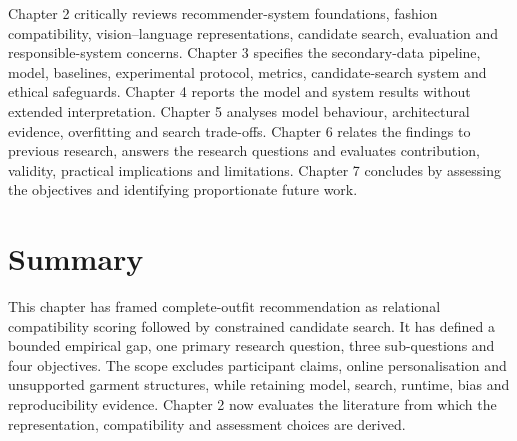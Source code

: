 Chapter 2 critically reviews recommender-system foundations, fashion
compatibility, vision--language representations, candidate search, evaluation
and responsible-system concerns. Chapter 3 specifies the secondary-data
pipeline, model, baselines, experimental protocol, metrics, candidate-search system
and ethical safeguards. Chapter 4 reports the model and system results without
extended interpretation. Chapter 5 analyses model behaviour, architectural
evidence, overfitting and search trade-offs. Chapter 6 relates the findings to
previous research, answers the research questions and evaluates contribution,
validity, practical implications and limitations. Chapter 7 concludes by
assessing the objectives and identifying proportionate future work.

\section{Summary}

This chapter has framed complete-outfit recommendation as relational
compatibility scoring followed by constrained candidate search. It has defined
a bounded empirical gap, one primary research question, three sub-questions
and four objectives. The scope excludes participant claims, online
personalisation and unsupported garment structures, while retaining model,
search, runtime, bias and reproducibility evidence. Chapter 2 now evaluates
the literature from which the representation, compatibility and assessment
choices are derived.
